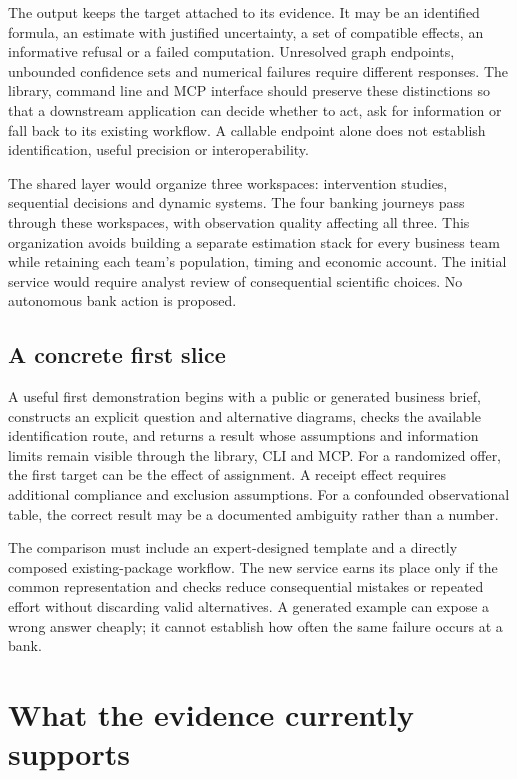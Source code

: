 The output keeps the target attached to its evidence. It may be an
identified formula, an estimate with justified uncertainty, a set of
compatible effects, an informative refusal or a failed computation.
Unresolved graph endpoints, unbounded confidence sets and numerical
failures require different responses. The library, command line and MCP
interface should preserve these distinctions so that a downstream
application can decide whether to act, ask for information or fall back
to its existing workflow. A callable endpoint alone does not establish
identification, useful precision or interoperability.
\citep{sp13_interfaces}

The shared layer would organize three workspaces: intervention studies,
sequential decisions and dynamic systems. The four banking journeys pass
through these workspaces, with observation quality affecting all three.
This organization avoids building a separate estimation stack for every
business team while retaining each team's population, timing and
economic account. The initial service would require analyst review of
consequential scientific choices. No autonomous bank action is proposed.

\hypertarget{a-concrete-first-slice}{%
\subsection{A concrete first slice}\label{a-concrete-first-slice}}

A useful first demonstration begins with a public or generated business
brief, constructs an explicit question and alternative diagrams, checks
the available identification route, and returns a result whose
assumptions and information limits remain visible through the library,
CLI and MCP. For a randomized offer, the first target can be the effect
of assignment. A receipt effect requires additional compliance and
exclusion assumptions. For a confounded observational table, the correct
result may be a documented ambiguity rather than a number.

The comparison must include an expert-designed template and a directly
composed existing-package workflow. The new service earns its place only
if the common representation and checks reduce consequential mistakes or
repeated effort without discarding valid alternatives. A generated
example can expose a wrong answer cheaply; it cannot establish how often
the same failure occurs at a bank.

\hypertarget{what-the-evidence-currently-supports}{%
\section{What the evidence currently
supports}\label{what-the-evidence-currently-supports}}

